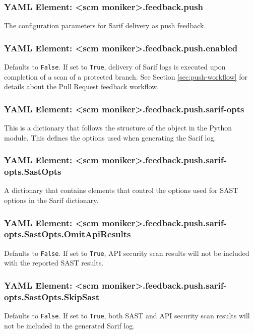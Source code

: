 \subsubsection{YAML Element: <scm moniker>.feedback.push}\label{sec:yaml-feedback-push}
The configuration parameters for Sarif delivery as push feedback.

\subsubsection{YAML Element: <scm moniker>.feedback.push.enabled}\label{sec:yaml-push-enabled}
Defaults to \texttt{False}.  If set to \texttt{True}, delivery of Sarif logs is executed upon completion of a scan
of a protected branch. See Section \ref{sec:push-workflow} for details about the Pull Request feedback workflow.

\subsubsection{YAML Element: <scm moniker>.feedback.push.sarif-opts}\label{sec:yaml-push-sarif-opts}
This is a dictionary that follows the structure of the 
object in the \cxonesarif Python module.  This defines the options used when generating the Sarif log.

\subsubsection{YAML Element: <scm moniker>.feedback.push.sarif-opts.SastOpts}\label{sec:yaml-push-sarif-opts-sastopts}
A dictionary that contains elements that control the options used for SAST options in the Sarif dictionary.

\subsubsection{YAML Element: <scm moniker>.feedback.push.sarif-opts.SastOpts.OmitApiResults}\label{sec:yaml-push-sarif-opts-sastopts-omitapiresults}
Defaults to \texttt{False}.  If set to \texttt{True}, API security scan results will not be included with the reported SAST results.

\subsubsection{YAML Element: <scm moniker>.feedback.push.sarif-opts.SastOpts.SkipSast}\label{sec:yaml-push-sarif-opts-sastopts-skipsast}
Defaults to \texttt{False}.  If set to \texttt{True}, both SAST and API security scan results will not be included in the generated Sarif log.

